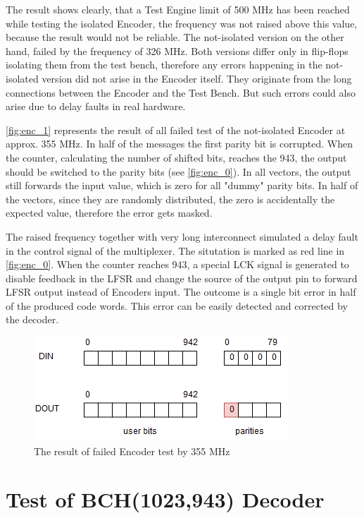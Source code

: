 The result shows clearly, that a Test Engine limit of 500 MHz has been reached while testing the isolated Encoder, the frequency was not raised above this value, because the result would not be reliable. The not-isolated version on the other hand, failed by the frequency of 326 MHz. Both versions differ only in flip-flops isolating them from the test bench, therefore any errors happening in the not-isolated version did not arise in the Encoder itself. They originate from the long connections between the Encoder and the Test Bench. But such errors could also arise due to delay faults in real hardware. 

\autoref{fig:enc_1} represents the result of all failed test of the not-isolated Encoder at approx. 355 MHz. In half of the messages the first parity bit is corrupted. When the counter, calculating the number of shifted bits, reaches the 943, the output should be switched to the parity bits (see \autoref{fig:enc_0}). In all vectors, the output still forwards the input value, which is zero for all "dummy" parity bits. In half of the vectors, since they are randomly distributed, the zero is accidentally the expected value, therefore the error gets masked.

The raised frequency together with very long interconnect simulated a delay fault in the control signal of the multiplexer. The situtation is marked as red line in \autoref{fig:enc_0}. When the counter reaches 943, a special LCK signal is generated to disable feedback in the LFSR and change the source of the output pin to forward LFSR output instead of Encoders input. The outcome is a single bit error in half of the produced code words. This error can be easily detected and corrected by the decoder.

\begin{figure}[h]
\centering
\includegraphics[width=.65\textwidth]{figures/enc_error.png}
\caption{The result of failed Encoder test by 355 MHz}
\label{fig:enc_1}
\end{figure}



\section{Test of BCH(1023,943) Decoder}

